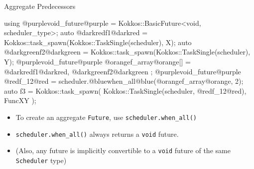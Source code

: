\begin{frame}[fragile]{Aggregate Predecessors}
  \begin{code}[keywords={}]
    using @purplevoid_future@purple =
      Kokkos::BasicFuture<void, scheduler_type>;
    auto @darkredf1@darkred =
      Kokkos::task_spawn(Kokkos::TaskSingle(scheduler), X{});
    auto @darkgreenf2@darkgreen =
      Kokkos::task_spawn(Kokkos::TaskSingle(scheduler), Y{});
    @purplevoid_future@purple @orangef_array@orange[] = { @darkredf1@darkred, @darkgreenf2@darkgreen };
    @purplevoid_future@purple @redf_12@red = scheduler.@bluewhen_all@blue(@orangef_array@orange, 2);
    auto f3 =
      Kokkos::task_spawn(
        Kokkos::TaskSingle(scheduler, @redf_12@red), FuncXY{}
      );
  \end{code}
  \begin{itemize}
    \item To create an aggregate \texttt{Future}, use \texttt{scheduler.when\_all()}
    \item \texttt{scheduler.when\_all()} always returns a \texttt{void} future.
    \item (Also, any future is implicitly convertible to a \texttt{void} future of the same \texttt{Scheduler} type)
  \end{itemize}
\end{frame}



